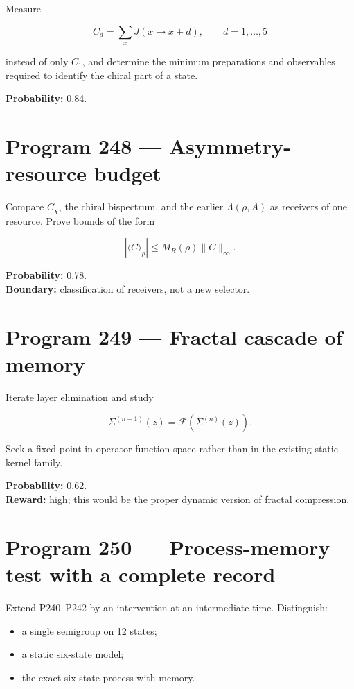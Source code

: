 \documentclass[11pt,a4paper,openany]{report}
\begin{document}
Measure

\[
C_d=\sum_xJ(x\to x+d),\qquad d=1,\ldots,5
\]

instead of only \(C_1\), and determine the minimum preparations and observables required to identify the chiral part of a state.

\textbf{Probability:} 0.84.

\section{Program 248 --- Asymmetry-resource budget}

Compare \(C_\chi\), the chiral bispectrum, and the earlier \(\Lambda(\rho,A)\) as receivers of one resource. Prove bounds of the form

\[
|\langle C\rangle_\rho|\leq M_R(\rho)\|C\|_\infty.
\]

\textbf{Probability:} 0.78.\\
\textbf{Boundary:} classification of receivers, not a new selector.

\section{Program 249 --- Fractal cascade of memory}

Iterate layer elimination and study

\[
\Sigma^{(n+1)}(z)=\mathcal F(\Sigma^{(n)}(z)).
\]

Seek a fixed point in operator-function space rather than in the existing static-kernel family.

\textbf{Probability:} 0.62.\\
\textbf{Reward:} high; this would be the proper dynamic version of fractal compression.

\section{Program 250 --- Process-memory test with a complete record}

Extend P240--P242 by an intervention at an intermediate time. Distinguish:

\begin{itemize}
\item 
a single semigroup on 12 states;

\item 
a static six-state model;

\item 
the exact six-state process with memory.

\end{itemize}
\end{document}
